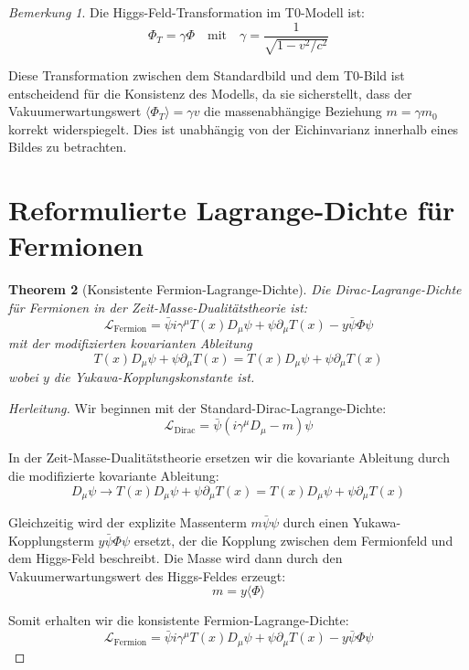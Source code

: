 \documentclass{article}
\newtheorem{theorem}{Theorem}[section]
\theoremstyle{definition}
\theoremstyle{remark}
\newtheorem{remark}[theorem]{Bemerkung}
\newcommand{\Tfield}{T(x)} %
\newcommand{\DcovT}[1]{\Tfield D_\mu #1 + #1 \partial_\mu \Tfield}
\begin{document}
		\begin{remark}
			Die Higgs-Feld-Transformation im T0-Modell ist:
			\begin{equation}
				\Phi_T = \gamma \Phi \quad \text{mit} \quad \gamma = \frac{1}{\sqrt{1-v^2/c^2}}
			\end{equation}
			
			Diese Transformation zwischen dem Standardbild und dem T0-Bild ist entscheidend für die Konsistenz des Modells, da sie sicherstellt, dass der Vakuumerwartungswert $\langle \Phi_T \rangle = \gamma v$ die massenabhängige Beziehung $m = \gamma m_0$ korrekt widerspiegelt. Dies ist unabhängig von der Eichinvarianz innerhalb eines Bildes zu betrachten.
		\end{remark}
		
		\section{Reformulierte Lagrange-Dichte für Fermionen}
		
		\begin{theorem}[Konsistente Fermion-Lagrange-Dichte]
			Die Dirac-Lagrange-Dichte für Fermionen in der Zeit-Masse-Dualitätstheorie ist:
			\begin{equation}
				\mathcal{L}_{\text{Fermion}} = \bar{\psi}i\gamma^\mu \DcovT{\psi} - y\bar{\psi}\Phi\psi
			\end{equation}
			mit der modifizierten kovarianten Ableitung
			\begin{equation}
				\DcovT{\psi} = \Tfield D_\mu \psi + \psi \partial_\mu \Tfield
			\end{equation}
			wobei $y$ die Yukawa-Kopplungskonstante ist.
		\end{theorem}
		
		\begin{proof}[Herleitung]
			Wir beginnen mit der Standard-Dirac-Lagrange-Dichte:
			\begin{equation}
				\mathcal{L}_{\text{Dirac}} = \bar{\psi}(i\gamma^\mu D_\mu - m)\psi
			\end{equation}
			
			In der Zeit-Masse-Dualitätstheorie ersetzen wir die kovariante Ableitung durch die modifizierte kovariante Ableitung:
			\begin{equation}
				D_\mu \psi \rightarrow \DcovT{\psi} = \Tfield D_\mu \psi + \psi \partial_\mu \Tfield
			\end{equation}
			
			Gleichzeitig wird der explizite Massenterm $m\bar{\psi}\psi$ durch einen Yukawa-Kopplungsterm $y\bar{\psi}\Phi\psi$ ersetzt, der die Kopplung zwischen dem Fermionfeld und dem Higgs-Feld beschreibt. Die Masse wird dann durch den Vakuumerwartungswert des Higgs-Feldes erzeugt:
			\begin{equation}
				m = y\langle\Phi\rangle
			\end{equation}
			
			Somit erhalten wir die konsistente Fermion-Lagrange-Dichte:
			\begin{equation}
				\mathcal{L}_{\text{Fermion}} = \bar{\psi}i\gamma^\mu \DcovT{\psi} - y\bar{\psi}\Phi\psi
			\end{equation}
		\end{proof}
		
\end{document}
